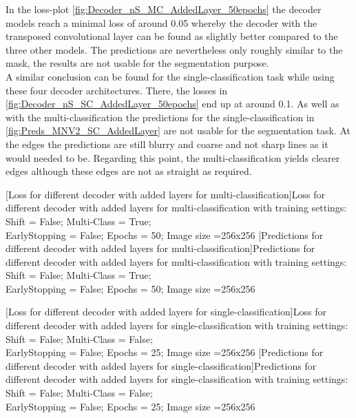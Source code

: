 In the loss-plot \cref{fig:Decoder_nS_MC_AddedLayer_50epochs} the decoder models reach a minimal loss of around 0.05 whereby the decoder with the transposed convolutional layer can be found as slightly better compared to the three other models. The predictions are nevertheless only roughly similar to the mask, the results are not usable for the segmentation purpose.\\
A similar conclusion can be found for the single-classification task while using these four decoder architectures. There, the losses in \cref{fig:Decoder_nS_SC_AddedLayer_50epochs} end up at around 0.1. As well as with the multi-classification the predictions for the single-classification in \cref{fig:Preds_MNV2_SC_AddedLayer} are not usable for the segmentation task. At the edges the predictions are still blurry and coarse and not sharp lines as it would needed to be. Regarding this point, the multi-classification yields clearer edges although these edges are not as straight as required.\\
\begin{minipage}{\textwidth}
\centering
	
	[Loss for different decoder with added layers for multi-classification]{Loss for different decoder with added layers for multi-classification with training settings: Shift = False; Multi-Class = True;\\ EarlyStopping = False; Epochs = 50; Image size =256x256}
	\label{fig:Decoder_nS_MC_AddedLayer_50epochs}
	\hspace{0.2cm}
	\hspace{0.2cm}
	[Predictions for different decoder with added layers for multi-classification]{Predictions for different decoder with added layers for multi-classification with training settings: Shift = False; Multi-Class = True;\\ EarlyStopping = False; Epochs = 50; Image size =256x256}
	\label{fig:Preds_MNV2_MC_AddedLayer}
\end{minipage}
\newpage
\begin{minipage}{\textwidth}
\centering
	
	[Loss for different decoder with added layers for single-classification]{Loss for different decoder with added layers for single-classification with training settings: Shift = False; Multi-Class = False;\\ EarlyStopping = False; Epochs = 25; Image size =256x256}
	\label{fig:Decoder_nS_SC_AddedLayer_50epochs}
	\hspace{0.2cm}
	\hspace{0.2cm}
	[Predictions for different decoder with added layers for single-classification]{Predictions for different decoder with added layers for single-classification with training settings: Shift = False; Multi-Class = False;\\ EarlyStopping = False; Epochs = 25; Image size =256x256}
	\label{fig:Preds_MNV2_SC_AddedLayer}
\end{minipage}
\newpage
